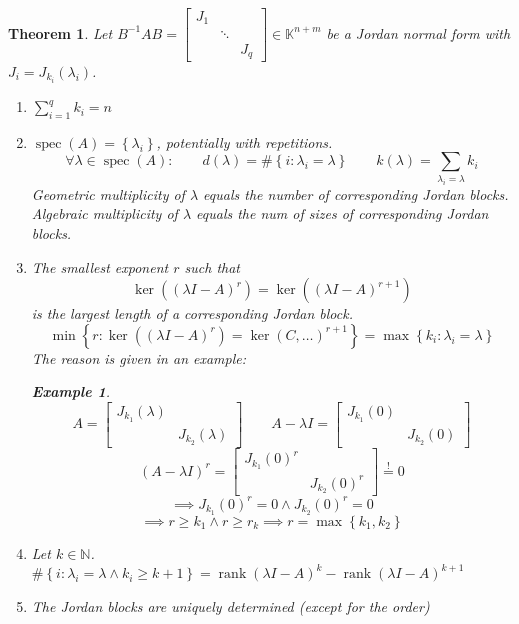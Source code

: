 \documentclass[a4paper]{article}
\newcounter{lecref}[section]
\numberwithin{lecref}{section}
\newtheorem{theorem}[lecref]{Theorem}
\newtheorem*{Example}{Example}
\newcommand{\set}[1]{\left\{#1\right\}}
\DeclareMathOperator{\rank}{rank}
\begin{document}
\begin{theorem} %
  Let $B^{-1} AB = \begin{bmatrix} J_1 & & \\ & \ddots & \\ & & J_q \end{bmatrix} \in \mathbb K^{n + m}$ be a Jordan normal form with $J_i = J_{k_i}(\lambda_i)$.
  \begin{enumerate}
    \item $\sum_{i=1}^q k_i = n$
    \item $\operatorname{spec}(A) = \set{\lambda_i}$, potentially with repetitions.
      \[ \forall \lambda \in \operatorname{spec}(A): \qquad d(\lambda) = \#\set{i: \lambda_i = \lambda} \qquad k(\lambda) = \sum_{\lambda_i = \lambda} k_i \]
      Geometric multiplicity of $\lambda$ equals the number of corresponding Jordan blocks.
      Algebraic multiplicity of $\lambda$ equals the num of sizes of corresponding Jordan blocks.
    \item The smallest exponent $r$ such that
      \[ \ker((\lambda I - A)^r) = \ker((\lambda I - A)^{r+1}) \]
      is the largest length of a corresponding Jordan block.
      \[ \min\set{r: \ker((\lambda I - A)^r) = \ker(C, \dots)^{r+1}} = \max\set{k_i: \lambda_i = \lambda} \]
      The reason is given in an example:
      \begin{Example}
        \[
          A = \begin{bmatrix}
            J_{k_1}(\lambda) & \\
            & J_{k_2}(\lambda)
          \end{bmatrix}
          \qquad
          A - \lambda I = \begin{bmatrix}
            J_{k_1}(0) & \\
            & J_{k_2}(0)
          \end{bmatrix}
        \] \[
          (A - \lambda I)^r = \begin{bmatrix}
            J_{k_1}(0)^r & \\
            & J_{k_2}(0)^r
          \end{bmatrix}
          \overset!= 0
        \] \[
          \implies J_{k_1}(0)^r = 0 \land J_{k_2}(0)^r = 0
        \] \[
          \implies r \geq k_1 \land r \geq r_k \implies r = \max\set{k_1, k_2}
        \]
      \end{Example}
    \item Let $k \in \mathbb N$. $\#\set{i: \lambda_i = \lambda \land k_i \geq k + 1} = \rank(\lambda I - A)^k - \rank(\lambda I - A)^{k+1}$
    \item The Jordan blocks are uniquely determined (except for the order)
  \end{enumerate}
\end{theorem}
\end{document}
